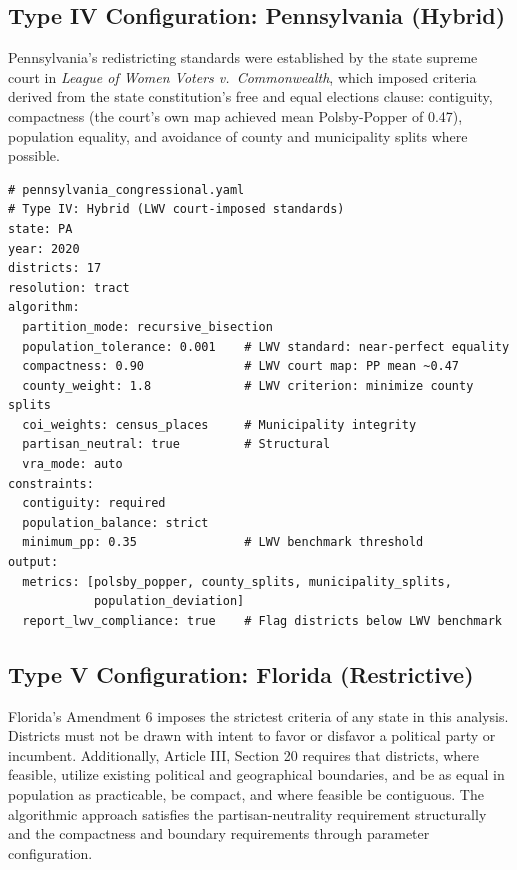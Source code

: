 \subsection{Type IV Configuration: Pennsylvania (Hybrid)}

Pennsylvania's redistricting standards were established by the state supreme court in \textit{League of Women Voters v.\ Commonwealth}, which imposed criteria derived from the state constitution's free and equal elections clause: contiguity, compactness (the court's own map achieved mean Polsby-Popper of 0.47), population equality, and avoidance of county and municipality splits where possible.

\begin{verbatim}
# pennsylvania_congressional.yaml
# Type IV: Hybrid (LWV court-imposed standards)
state: PA
year: 2020
districts: 17
resolution: tract
algorithm:
  partition_mode: recursive_bisection
  population_tolerance: 0.001    # LWV standard: near-perfect equality
  compactness: 0.90              # LWV court map: PP mean ~0.47
  county_weight: 1.8             # LWV criterion: minimize county splits
  coi_weights: census_places     # Municipality integrity
  partisan_neutral: true         # Structural
  vra_mode: auto
constraints:
  contiguity: required
  population_balance: strict
  minimum_pp: 0.35               # LWV benchmark threshold
output:
  metrics: [polsby_popper, county_splits, municipality_splits,
            population_deviation]
  report_lwv_compliance: true    # Flag districts below LWV benchmark
\end{verbatim}

\subsection{Type V Configuration: Florida (Restrictive)}

Florida's Amendment 6 imposes the strictest criteria of any state in this analysis. Districts must not be drawn with intent to favor or disfavor a political party or incumbent. Additionally, Article III, Section 20 requires that districts, where feasible, utilize existing political and geographical boundaries, and be as equal in population as practicable, be compact, and where feasible be contiguous. The algorithmic approach satisfies the partisan-neutrality requirement structurally and the compactness and boundary requirements through parameter configuration.

